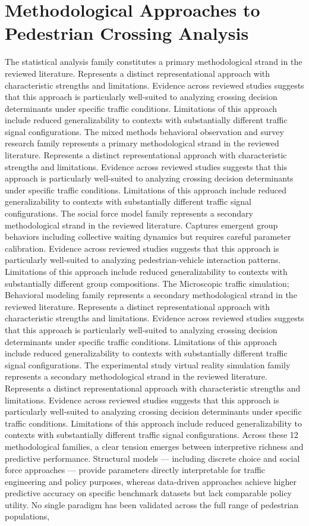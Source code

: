 \documentclass{article}
\begin{document}
\section{Methodological Approaches to Pedestrian Crossing Analysis}
The statistical analysis family constitutes a primary methodological strand in the reviewed literature. Represents a distinct representational approach with characteristic strengths and limitations. Evidence across reviewed studies suggests that this approach is particularly well-suited to analyzing crossing decision determinants under specific traffic conditions. Limitations of this approach include reduced generalizability to contexts with substantially different traffic signal configurations. The mixed methods behavioral observation and survey research family represents a primary methodological strand in the reviewed literature. Represents a distinct representational approach with characteristic strengths and limitations. Evidence across reviewed studies suggests that this approach is particularly well-suited to analyzing crossing decision determinants under specific traffic conditions. Limitations of this approach include reduced generalizability to contexts with substantially different traffic signal configurations. The social force model family represents a secondary methodological strand in the reviewed literature. Captures emergent group behaviors including collective waiting dynamics but requires careful parameter calibration. Evidence across reviewed studies suggests that this approach is particularly well-suited to analyzing pedestrian-vehicle interaction patterns. Limitations of this approach include reduced generalizability to contexts with substantially different group compositions. The Microscopic traffic simulation; Behavioral modeling family represents a secondary methodological strand in the reviewed literature. Represents a distinct representational approach with characteristic strengths and limitations. Evidence across reviewed studies suggests that this approach is particularly well-suited to analyzing crossing decision determinants under specific traffic conditions. Limitations of this approach include reduced generalizability to contexts with substantially different traffic signal configurations. The experimental study virtual reality simulation family represents a secondary methodological strand in the reviewed literature. Represents a distinct representational approach with characteristic strengths and limitations. Evidence across reviewed studies suggests that this approach is particularly well-suited to analyzing crossing decision determinants under specific traffic conditions. Limitations of this approach include reduced generalizability to contexts with substantially different traffic signal configurations. Across these 12 methodological families, a clear tension emerges between interpretive richness and predictive performance. Structural models — including discrete choice and social force approaches — provide parameters directly interpretable for traffic engineering and policy purposes, whereas data-driven approaches achieve higher predictive accuracy on specific benchmark datasets but lack comparable policy utility. No single paradigm has been validated across the full range of pedestrian populations, 
\end{document}

